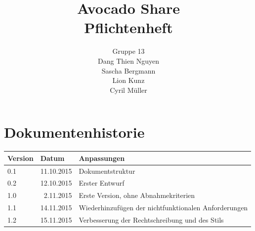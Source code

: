 \documentclass{avocado}
\title{\LARGE{Avocado Share}\\\large{Pflichtenheft}}
\author{%
    Gruppe 13 \\%
    \normalsize{Dang Thien Nguyen} \\%
    \normalsize{Sascha Bergmann} \\%
    \normalsize{Lion Kunz} \\%
    \normalsize{Cyril Müller} \\%
}
\begin{document}


\clearpage
\maketitle
\thispagestyle{empty}\clearpage

\section*{Dokumentenhistorie}
\begin{tabularx}{\linewidth}{|l|r|X|} \hline
Version & \multicolumn{1}{l|}{Datum} 			& Anpassungen \\ \hline
0.1 & 11.10.2015		& Dokumentstruktur \\ \hline
0.2	& 12.10.2015       & Erster Entwurf  \\ \hline
1.0 &  2.11.2015		& Erste Version, ohne Abnahmekriterien \\ \hline
1.1 & 14.11.2015        & Wiederhinzufügen der nichtfunktionalen Anforderungen \\ \hline
1.2 & 15.11.2015        & Verbesserung der Rechtschreibung und des Stils\\ \hline
\end{tabularx}
\vfill
\end{document}
